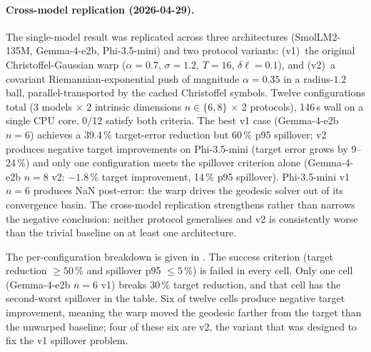 \documentclass[11pt]{article}
\begin{document}
\paragraph{Cross-model replication (2026-04-29).}
The single-model result was replicated across three architectures
(SmolLM2-135M, Gemma-4-e2b, Phi-3.5-mini) and two protocol variants:
(v1)~the original Christoffel-Gaussian warp ($\alpha{=}0.7$,
$\sigma{=}1.2$, $T{=}16$, $\delta\ell{=}0.1$), and (v2)~a covariant
Riemannian-exponential push of magnitude $\alpha{=}0.35$ in a
radius-$1.2$ ball, parallel-transported by the cached Christoffel
symbols. Twelve configurations total (3 models $\times$ 2 intrinsic
dimensions $n\in\{6,8\}$ $\times$ 2 protocols), 146\,s wall on a single
CPU core. 0/12 satisfy both criteria. The best v1 case
(Gemma-4-e2b $n{=}6$) achieves a 39.4\,\% target-error reduction but
60\,\% p95 spillover; v2 produces negative target improvements
on Phi-3.5-mini (target error grows by 9--24\,\%) and only one
configuration meets the spillover criterion alone (Gemma-4-e2b $n{=}8$
v2: $-1.8$\,\% target improvement, 14\,\% p95 spillover). Phi-3.5-mini
v1 $n{=}6$ produces NaN post-error: the warp drives the geodesic
solver out of its convergence basin. The cross-model replication
strengthens rather than narrows the negative conclusion:
neither protocol generalises and v2 is consistently worse than the
trivial baseline on at least one architecture.

The per-configuration breakdown is given in .
The success criterion (target reduction $\geq 50$\,\% and
spillover p95 $\leq 5$\,\%) is failed in every cell. Only one cell
(Gemma-4-e2b $n{=}6$ v1) breaks $30$\,\% target reduction, and that
cell has the second-worst spillover in the table. Six of twelve
cells produce negative target improvement, meaning the warp
moved the geodesic farther from the target than the unwarped
baseline; four of these six are v2, the variant that was designed to
fix the v1 spillover problem.
\end{document}
